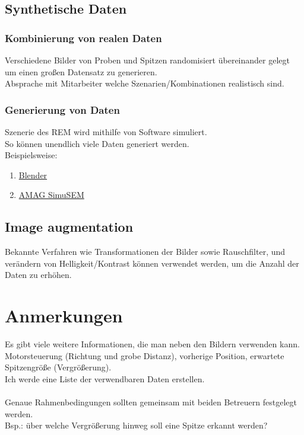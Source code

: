 \documentclass{article}
\begin{document}
	\subsection{Synthetische Daten}
	\subsubsection{Kombinierung von realen Daten}
	Verschiedene Bilder von Proben und Spitzen randomisiert übereinander gelegt um einen großen Datensatz zu generieren.\\
	Absprache mit Mitarbeiter welche Szenarien/Kombinationen realistisch sind.\\
	\subsubsection{Generierung von Daten}
	Szenerie des REM wird mithilfe von Software simuliert.\\
	So können unendlich viele Daten generiert werden.\\
	Beispielsweise:
	\begin{enumerate}
		\item \href{https://www.blender.org/}{Blender}
		\item \href{https://www.amagnm.com/pages/amag-simusem}{AMAG SimuSEM}
	\end{enumerate} 
	\subsection{Image augmentation}
	Bekannte Verfahren wie Transformationen der Bilder sowie Rauschfilter, und verändern von Helligkeit/Kontrast können verwendet werden, um die Anzahl der Daten zu erhöhen.
	
	\section{Anmerkungen}
	Es gibt viele weitere Informationen, die man neben den Bildern verwenden kann.\\
	Motorsteuerung (Richtung und grobe Distanz), vorherige Position, erwartete Spitzengröße (Vergrößerung).\\
	Ich werde eine Liste der verwendbaren Daten erstellen.\\
	\\
	Genaue Rahmenbedingungen sollten gemeinsam mit beiden Betreuern festgelegt werden.\\
	Bsp.: über welche Vergrößerung hinweg soll eine Spitze erkannt werden?
	
	
	

	
\end{document}
